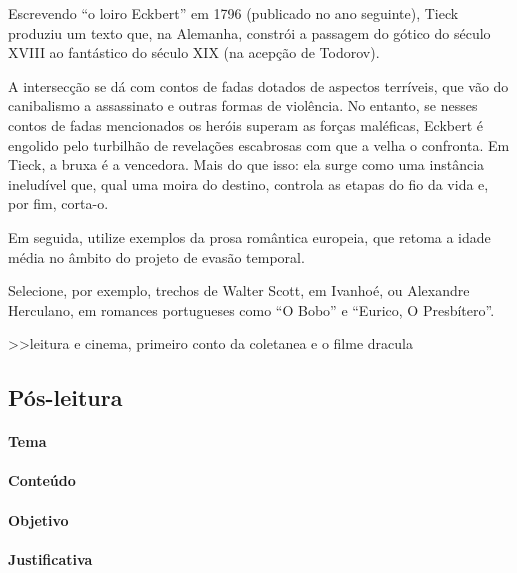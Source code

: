 \documentclass[11pt]{extarticle}
\begin{document}
Escrevendo ``o loiro Eckbert'' em 1796 (publicado no ano seguinte),
Tieck produziu um texto que, na Alemanha, constrói a passagem do gótico
do século XVIII ao fantástico do século XIX (na acepção de Todorov).


A intersecção se dá com contos de fadas dotados de aspectos terríveis,
que vão do canibalismo a assassinato e outras formas de violência. No
entanto, se nesses contos de fadas mencionados os heróis superam as
forças maléficas, Eckbert é engolido pelo turbilhão de revelações
escabrosas com que a velha o confronta. Em Tieck, a bruxa é a vencedora.
Mais do que isso: ela surge como uma instância ineludível que, qual uma
moira do destino, controla as etapas do fio da vida e, por fim, corta-o.

Em seguida, utilize exemplos da prosa romântica europeia, que retoma a
idade média no âmbito do projeto de evasão temporal.

Selecione, por exemplo, trechos de Walter Scott, em Ivanhoé, ou
Alexandre Herculano, em romances portugueses como ``O Bobo'' e ``Eurico,
O Presbítero''.

>>leitura e cinema, primeiro conto da coletanea e o filme dracula 

\subsection{Pós-leitura}


\paragraph{Tema}

\paragraph{Conteúdo}

\paragraph{Objetivo}

\paragraph{Justificativa}
\end{document}
